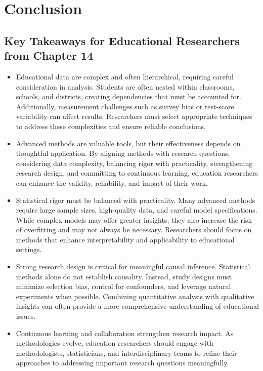 \documentclass[
  letterpaper,
  DIV=11,
  numbers=noendperiod]{scrreprt}
\begin{document}

\chapter*{Conclusion}\label{conclusion-13}


\section*{Key Takeaways for Educational Researchers from Chapter
14}\label{key-takeaways-for-educational-researchers-from-chapter-14}


\begin{itemize}
\item
  Educational data are complex and often hierarchical, requiring careful
  consideration in analysis. Students are often nested within
  classrooms, schools, and districts, creating dependencies that must be
  accounted for. Additionally, measurement challenges such as survey
  bias or test-score variability can affect results. Researchers must
  select appropriate techniques to address these complexities and ensure
  reliable conclusions.
\item
  Advanced methods are valuable tools, but their effectiveness depends
  on thoughtful application. By aligning methods with research
  questions, considering data complexity, balancing rigor with
  practicality, strengthening research design, and committing to
  continuous learning, education researchers can enhance the validity,
  reliability, and impact of their work.
\item
  Statistical rigor must be balanced with practicality. Many advanced
  methods require large sample sizes, high-quality data, and careful
  model specifications. While complex models may offer greater insights,
  they also increase the risk of overfitting and may not always be
  necessary. Researchers should focus on methods that enhance
  interpretability and applicability to educational settings.
\item
  Strong research design is critical for meaningful causal inference.
  Statistical methods alone do not establish causality. Instead, study
  designs must minimize selection bias, control for confounders, and
  leverage natural experiments when possible. Combining quantitative
  analysis with qualitative insights can often provide a more
  comprehensive understanding of educational issues.
\item
  Continuous learning and collaboration strengthen research impact. As
  methodologies evolve, education researchers should engage with
  methodologists, statisticians, and interdisciplinary teams to refine
  their approaches to addressing important research questions
  meaningfully.
\end{itemize}
\end{document}
